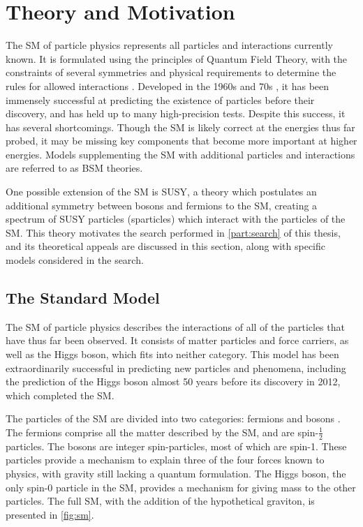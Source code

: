 
\chapter{Theory and Motivation} %

\label{ch:theory} %
The \acf{SM} of particle physics represents all particles and interactions currently known. It is formulated using the principles of Quantum Field Theory, with the constraints of several symmetries and physical requirements to determine the rules for allowed interactions \cite{Burgess:2007zi}. Developed in the 1960s and 70s \cite{Glashow:1961tr, PhysRev.127.331, PhysRevLett.19.1264}, it has been immensely successful at predicting the existence of particles before their discovery, and has held up to many high-precision tests. Despite this success, it has several shortcomings. Though the \ac{SM} is likely correct at the energies thus far probed, it may be missing key components that become more important at higher energies. Models supplementing the \ac{SM} with additional particles and interactions are referred to as \ac{BSM} theories. 

One possible extension of the \ac{SM} is \ac{SUSY}, a theory which postulates an additional symmetry between bosons and fermions to the \ac{SM}, creating a spectrum of \ac{SUSY} particles (sparticles) which interact with the particles of the \ac{SM}. This theory motivates the search performed in \autoref{part:search} of this thesis, and its theoretical appeals are discussed in this section, along with specific models considered in the search. 


\section{The Standard Model}
\label{sec:standard_model}
The \ac{SM} of particle physics describes the interactions of all of the particles that have thus far been observed. It consists of matter particles and force carriers, as well as the Higgs boson, which fits into neither category. This model has been extraordinarily successful in predicting new particles and phenomena, including the prediction of the Higgs boson almost 50 years before its discovery in 2012, which completed the \ac{SM}.  

The particles of the \ac{SM} are divided into two categories: fermions and bosons \cite{Burgess:2007zi}. The fermions comprise all the matter described by the \ac{SM}, and are spin-$\frac{1}{2}$ particles. The bosons are integer spin-particles, most of which are spin-1. These particles provide a mechanism to explain three of the four forces known to physics, with gravity still lacking a quantum formulation. The Higgs boson, the only spin-0 particle in the \ac{SM}, provides a mechanism for giving mass to the other particles. The full \ac{SM}, with the addition of the hypothetical graviton, is presented in \autoref{fig:sm}. 

